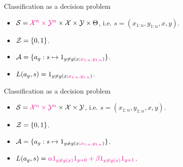 \documentclass[10pt]{beamer}
\begin{document}
\begin{frame}{Classification as a decision problem}
  \begin{itemize}
    \item $\mathcal{S} = \textcolor{magenta}{\mathcal{X}^n\times\mathcal{Y}^n}\times \mathcal{X}\times \mathcal{Y} \times \Theta$, i.e. $s = (x_{1:n}, y_{1:n}, x, y)$.
    \item $\mathcal{Z} = \{0,1\}$.
    \item $\mathcal{A} = \{a_g: s\mapsto 1_{y\neq g(x; \textcolor{magenta}{x_{1:n}, y_{1:n}})}\}$.
    \item $L(a_g,s) = 1_{y\neq g(x; \textcolor{magenta}{x_{1:n}, y_{1:n}})}$.
    \end{itemize}
    \blank
    \vfill
\end{frame}

\begin{frame}{Classification as a decision problem }
  \begin{itemize}
    \item $\mathcal{S} = \textcolor{magenta}{\mathcal{X}^n\times\mathcal{Y}^n}\times \mathcal{X}\times \mathcal{Y}$, i.e. $s = (x_{1:n}, y_{1:n}, x, y)$.
    \item $\mathcal{Z} = \{0,1\}$.
    \item $\mathcal{A} = \{a_g: s\mapsto 1_{y\neq g(x; \textcolor{magenta}{x_{1:n}, y_{1:n}})}\}$.
    \item $L(a_g,s) = \textcolor{magenta}{\alpha 1_{y\neq g(x)} 1_{y = 0} + \beta 1_{y\neq g(x)} 1_{y = 1}}$.
    \end{itemize}
    \blank
    \vfill
\end{frame}


\end{document}
